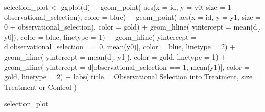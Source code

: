 \documentclass[
]{article}
\newenvironment{Shaded}{\begin{snugshade}}{\end{snugshade}}
\newcommand{\AttributeTok}[1]{\textcolor[rgb]{0.77,0.63,0.00}{#1}}
\newcommand{\DecValTok}[1]{\textcolor[rgb]{0.00,0.00,0.81}{#1}}
\newcommand{\FunctionTok}[1]{\textcolor[rgb]{0.00,0.00,0.00}{#1}}
\newcommand{\NormalTok}[1]{#1}
\newcommand{\OtherTok}[1]{\textcolor[rgb]{0.56,0.35,0.01}{#1}}
\newcommand{\SpecialCharTok}[1]{\textcolor[rgb]{0.00,0.00,0.00}{#1}}
\newcommand{\StringTok}[1]{\textcolor[rgb]{0.31,0.60,0.02}{#1}}
\begin{document}
\begin{Shaded}
\begin{Highlighting}[]
\NormalTok{selection\_plot }\OtherTok{\textless{}{-}} \FunctionTok{ggplot}\NormalTok{(d) }\SpecialCharTok{+} 
  \FunctionTok{geom\_point}\NormalTok{(}
    \FunctionTok{aes}\NormalTok{(}\AttributeTok{x =}\NormalTok{ id, }\AttributeTok{y =}\NormalTok{ y0, }\AttributeTok{size =} \DecValTok{1} \SpecialCharTok{{-}}\NormalTok{ observational\_selection), }
    \AttributeTok{color =}\NormalTok{ blue) }\SpecialCharTok{+} 
  \FunctionTok{geom\_point}\NormalTok{(}
    \FunctionTok{aes}\NormalTok{(}\AttributeTok{x =}\NormalTok{ id, }\AttributeTok{y =}\NormalTok{ y1, }\AttributeTok{size =} \DecValTok{0} \SpecialCharTok{+}\NormalTok{ observational\_selection), }\AttributeTok{color =}\NormalTok{ gold) }\SpecialCharTok{+} 
  \FunctionTok{geom\_hline}\NormalTok{(}
    \AttributeTok{yintercept =} \FunctionTok{mean}\NormalTok{(d[, y0]), }
    \AttributeTok{color =}\NormalTok{ blue, }
    \AttributeTok{linetype =} \DecValTok{1}\NormalTok{) }\SpecialCharTok{+} 
  \FunctionTok{geom\_hline}\NormalTok{(}
    \AttributeTok{yintercept =}\NormalTok{ d[observational\_selection }\SpecialCharTok{==} \DecValTok{0}\NormalTok{, }\FunctionTok{mean}\NormalTok{(y0)], }
    \AttributeTok{color =}\NormalTok{ blue, }
    \AttributeTok{linetype =} \DecValTok{2}\NormalTok{) }\SpecialCharTok{+} 
  \FunctionTok{geom\_hline}\NormalTok{(}
    \AttributeTok{yintercept =} \FunctionTok{mean}\NormalTok{(d[, y1]), }
    \AttributeTok{color =}\NormalTok{ gold, }
    \AttributeTok{linetype =} \DecValTok{1}\NormalTok{) }\SpecialCharTok{+}
  \FunctionTok{geom\_hline}\NormalTok{(}
    \AttributeTok{yintercept =}\NormalTok{ d[observational\_selection }\SpecialCharTok{==} \DecValTok{1}\NormalTok{, }\FunctionTok{mean}\NormalTok{(y1)], }
    \AttributeTok{color =}\NormalTok{ gold, }
    \AttributeTok{linetype =} \DecValTok{2}\NormalTok{) }\SpecialCharTok{+} 
  \FunctionTok{labs}\NormalTok{(}
    \AttributeTok{title =} \StringTok{\textquotesingle{}Observational Selection into Treatment\textquotesingle{}}\NormalTok{, }
    \AttributeTok{size =} \StringTok{\textquotesingle{}Treatment or Control\textquotesingle{}}
\NormalTok{  )}

\NormalTok{selection\_plot}
\end{Highlighting}
\end{Shaded}
\end{document}
